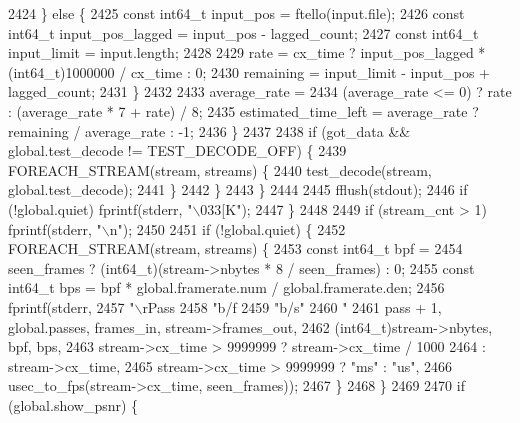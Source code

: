 \begin{DoxyCodeInclude}
{{{{{{{{{{{{{{{{{{{{{{{{{{{{{{{{{{{{{{{{{{{{{{{{{{{{{{{{{{2424           \} \textcolor{keywordflow}{else} \{
2425             \textcolor{keyword}{const} int64\_t input\_pos = ftello(input.file);
2426             \textcolor{keyword}{const} int64\_t input\_pos\_lagged = input\_pos - lagged\_count;
2427             \textcolor{keyword}{const} int64\_t input\_limit = input.length;
2428 
2429             rate = cx\_time ? input\_pos\_lagged * (int64\_t)1000000 / cx\_time : 0;
2430             remaining = input\_limit - input\_pos + lagged\_count;
2431           \}
2432 
2433           average\_rate =
2434               (average\_rate <= 0) ? rate : (average\_rate * 7 + rate) / 8;
2435           estimated\_time\_left = average\_rate ? remaining / average\_rate : -1;
2436         \}
2437 
2438         \textcolor{keywordflow}{if} (got\_data && global.test\_decode != TEST\_DECODE\_OFF) \{
2439           FOREACH\_STREAM(stream, streams) \{
2440             test\_decode(stream, global.test\_decode);
2441           \}
2442         \}
2443       \}
2444 
2445       fflush(stdout);
2446       \textcolor{keywordflow}{if} (!global.quiet) fprintf(stderr, \textcolor{stringliteral}{"\(\backslash\)033[K"});
2447     \}
2448 
2449     \textcolor{keywordflow}{if} (stream\_cnt > 1) fprintf(stderr, \textcolor{stringliteral}{"\(\backslash\)n"});
2450 
2451     \textcolor{keywordflow}{if} (!global.quiet) \{
2452       FOREACH\_STREAM(stream, streams) \{
2453         \textcolor{keyword}{const} int64\_t bpf =
2454             seen\_frames ? (int64\_t)(stream->nbytes * 8 / seen\_frames) : 0;
2455         \textcolor{keyword}{const} int64\_t bps = bpf * global.framerate.num / global.framerate.den;
2456         fprintf(stderr,
2457                 \textcolor{stringliteral}{"\(\backslash\)rPass %
2458                 \textcolor{stringliteral}{"b/f %
2459                 \textcolor{stringliteral}{"b/s"}
2460                 \textcolor{stringliteral}{" %
2461                 pass + 1, global.passes, frames\_in, stream->frames\_out,
2462                 (int64\_t)stream->nbytes, bpf, bps,
2463                 stream->cx\_time > 9999999 ? stream->cx\_time / 1000
2464                                           : stream->cx\_time,
2465                 stream->cx\_time > 9999999 ? \textcolor{stringliteral}{"ms"} : \textcolor{stringliteral}{"us"},
2466                 usec\_to\_fps(stream->cx\_time, seen\_frames));
2467       \}
2468     \}
2469 
2470     \textcolor{keywordflow}{if} (global.show\_psnr) \{
}}}}}}}}}}}}}}}}}}}}}}}}}}}}}}}}}}}}}}}}}}}}}}}}}}}}}}}}}}}}}
\end{DoxyCodeInclude}
